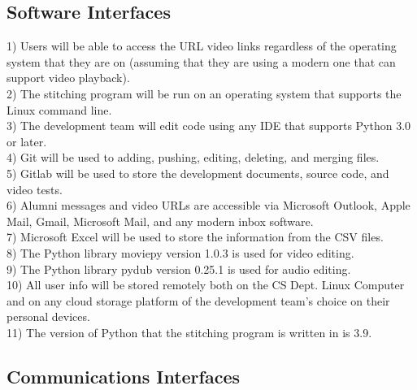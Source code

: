 \subsection{Software Interfaces}

1) Users will be able to access the URL video links regardless of the operating system that they are on (assuming that they are using
a modern one that can support video playback).\\
2) The stitching program will be run on an operating system that supports the Linux command line.\\
3) The development team will edit code using any IDE that supports Python 3.0 or later.\\
4) Git will be used to adding, pushing, editing, deleting, and merging files.\\
5) Gitlab will be used to store the development documents, source code, and video tests. \\
6) Alumni messages and video URLs are accessible via Microsoft Outlook, Apple Mail, Gmail, Microsoft Mail, and any modern inbox software.\\
7) Microsoft Excel will be used to store the information from the CSV files.\\
8) The Python library moviepy version 1.0.3 is used for video editing.\\
9) The Python library pydub version 0.25.1 is used for audio editing.\\
10) All user info will be stored remotely both on the CS Dept. Linux Computer and on any cloud storage platform of the development team's choice on their
personal devices.\\
11) The version of Python that the stitching program is written in is 3.9.\\

\subsection{Communications Interfaces}

